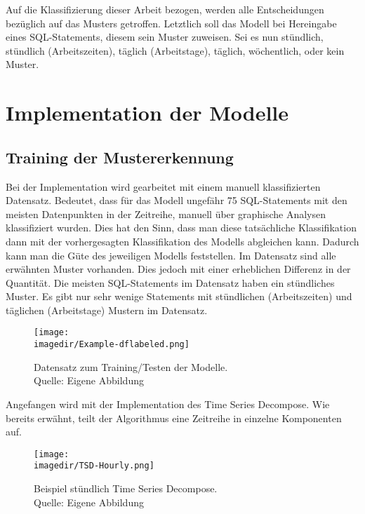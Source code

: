  Auf die Klassifizierung dieser Arbeit bezogen, werden alle Entscheidungen bezüglich auf das Musters getroffen. Letztlich soll das Modell bei Hereingabe eines SQL-Statements, diesem sein Muster zuweisen. Sei es nun stündlich, stündlich (Arbeitszeiten), täglich (Arbeitstage), täglich, wöchentlich, oder kein Muster.

\section{Implementation der Modelle}

\subsection{Training der Mustererkennung}

Bei der Implementation wird gearbeitet mit einem manuell klassifizierten Datensatz. Bedeutet, dass für das Modell ungefähr 75 SQL-Statements mit den meisten Datenpunkten in der Zeitreihe, manuell über graphische Analysen klassifiziert wurden. Dies hat den Sinn, dass man diese tatsächliche Klassifikation dann mit der vorhergesagten Klassifikation des Modells abgleichen kann. Dadurch kann man die Güte des jeweiligen Modells feststellen. Im Datensatz sind alle erwähnten Muster vorhanden. Dies jedoch mit einer erheblichen Differenz in der Quantität. Die meisten SQL-Statements im Datensatz haben ein stündliches Muster. Es gibt nur sehr wenige Statements mit stündlichen (Arbeitszeiten) und täglichen (Arbeitstage) Mustern im Datensatz.

\begin{figure}[H]
	
	\centering
	\texttt{[image: \\imagedir/Example-dflabeled.png]}
	\captionsetup{format=hang}
	\caption[Datensatz zum Training/Testen der Modelle]{\label{fig:test}Datensatz zum Training/Testen der Modelle. \\Quelle: Eigene Abbildung}
\end{figure}

Angefangen wird mit der Implementation des Time Series Decompose. Wie bereits erwähnt, teilt der Algorithmus eine Zeitreihe in einzelne Komponenten auf. 

\begin{figure}[H]
	
	\centering
	\texttt{[image: \\imagedir/TSD-Hourly.png]}
	\captionsetup{format=hang}
	\caption[Beispiel stündlich Time Series Decompose]{\label{fig:test}Beispiel stündlich Time Series Decompose. \\Quelle: Eigene Abbildung}
	
\end{figure}

